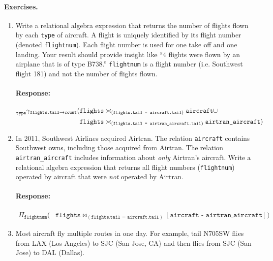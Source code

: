 \documentclass{report}
\renewcommand{\tt}[1]{\texttt{{#1}}}
\newenvironment{response}{\begin{responseframe}\vspace{-10pt}\paragraph{Response:}}{\end{responseframe}}
\begin{document}
\paragraph{Exercises.}
\begin{enumerate}[label=(\alph*)]
    \item Write a relational algebra expression that returns the number of flights flown by each 
        \tt{type} of aircraft. A flight is uniquely identified by its flight number (denoted 
        \tt{flightnum}). Each flight number is used for one take off and one landing. Your result 
        should provide insight like ``4 flights were flown by an airplane that is of type B738.'' 
        \tt{flightnum} is a flight number (i.e. Southwest flight 181) and not the number of flights 
        flown.
        \begin{response}
            \begin{align*}
                \prescript{}{\tt{type}}{\gamma}_{\tt{flights.tail} \to \tt{count}}
                (
                    &\tt{flights} \bowtie_{(\tt{flights.tail = aircraft.tail})} \tt{aircraft}
                    \cup \\
                    &\tt{flights} \bowtie_{(\tt{flights.tail = airtran\_aircraft.tail})} \tt{airtran\_aircraft}
                )
            \end{align*}
        \end{response}
    \item In 2011, Southwest Airlines acquired Airtran. The relation \tt{aircraft} contains 
        Southwest owns, including those acquired from Airtran. The relation \tt{airtran\_aircraft} 
        includes information about \emph{only} Airtran’s aircraft. Write a relational algebra 
        expression that returns all flight numbers (\tt{flightnum}) operated by aircraft that were 
        \emph{not} operated by Airtran.
        \begin{response}
            \begin{align*}
                \Pi_{\tt{flightnum}}
                (
                &\tt{flights} \bowtie_{(\tt{flights.tail = aircraft.tail})} [\tt{aircraft - airtran\_aircraft}]
                )
            \end{align*}
        \end{response}
    \item Most aircraft fly multiple routes in one day. For example, tail N705SW flies from LAX 
        (Los Angeles) to SJC (San Jose, CA) and then flies from SJC (San Jose) to DAL (Dallas). 

\end{enumerate}
\end{document}
